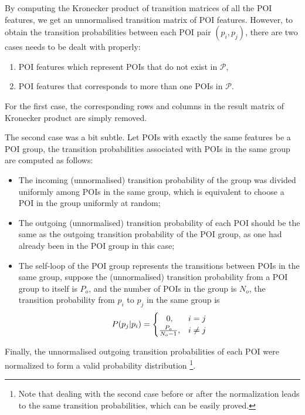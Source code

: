 By computing the Kronecker product of transition matrices of all the POI features,
we get an unnormalised transition matrix of POI features.
However, to obtain the transition probabilities between each POI pair $(p_i, p_j)$,
there are two cases needs to be dealt with properly:
\begin{enumerate}
\item POI features which represent POIs that do not exist in $\mathcal{P}$,
\item POI features that corresponds to more than one POIs in $\mathcal{P}$.
\end{enumerate}

For the first case,
the corresponding rows and columns in the result matrix of Kronecker product are simply removed.

The second case was a bit subtle.
Let POIs with exactly the same features be a POI group,
the transition probabilities associated with POIs in the same group are computed as follows:
\begin{itemize}
\item The incoming (unnormalised) transition probability of the group was divided uniformly among POIs
      in the same group, which is equivalent to choose a POI in the group uniformly at random;
\item The outgoing (unnormalised) transition probability of each POI should be the same as the
      outgoing transition probability of the POI group, as one had already been in the POI group in this case;
\item The self-loop of the POI group represents the transitions between POIs in the same group,
      suppose the (unnormalised) transition probability from a POI group to itself is $P_o$,
      and the number of POIs in the group is $N_o$,
      the transition probability from $p_i$ to $p_j$ in the same group is
      \begin{displaymath}
          P(p_j | p_i) =
          \begin{cases}
              \hfill 0, \hfill & i = j \\
              \hfill \frac{P_o}{N_o - 1}, \hfill & i \ne j \\
          \end{cases}
      \end{displaymath}
\end{itemize}
Finally, the unnormalised outgoing transition probabilities of each POI were normalized to form
a valid probability distribution
\footnote{Note that dealing with the second case before or after the normalization leads to
the same transition probabilities, which can be easily proved. }.


